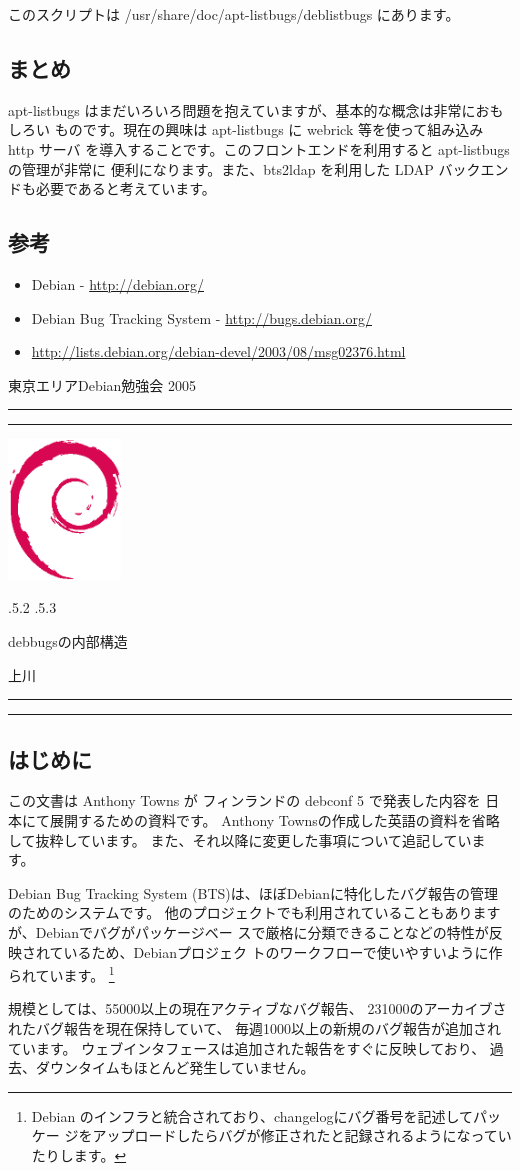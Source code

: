 \documentclass[mingoth,a4paper]{jsarticle}
\makeatletter
\renewcommand{\section}{\@startsection{section}{1}{\z@}%
    {\Cvs \@plus.5\Cdp \@minus.2\Cdp}%
    {.5\Cvs \@plus.3\Cdp}%
    {\normalfont\Large\headfont\raggedright\centering}} %
\newcommand{\dancersection}[2]{%
\newpage
東京エリアDebian勉強会 2005
\hrule
\vspace{0.5mm}
\hrule
\hfill{}\includegraphics[width=3cm]{image200502/openlogo-nd.eps}\\
\vspace{-4cm}
\begin{center}
  \section{#1}
\end{center}
\hfill{}#2\hspace{3cm}\space\\
\hrule
\hrule
\vspace{1cm}
}
\makeatother
\begin{document}
このスクリプトは /usr/share/doc/apt-listbugs/deblistbugs にあります。

\subsection{まとめ}

apt-listbugs はまだいろいろ問題を抱えていますが、基本的な概念は非常におもしろい
ものです。現在の興味は apt-listbugs に webrick 等を使って組み込み http サーバ
を導入することです。このフロントエンドを利用すると apt-listbugs の管理が非常に
便利になります。また、bts2ldap を利用した LDAP バックエンドも必要であると考えています。

\subsection{参考}

\begin{itemize}
\item Debian - \url{http://debian.org/}
\item Debian Bug Tracking System - \url{http://bugs.debian.org/}
\item \url{http://lists.debian.org/debian-devel/2003/08/msg02376.html}
\end{itemize}


\dancersection{debbugsの内部構造}{上川}
\label{sec:uekawa}

\subsection{はじめに}

この文書は Anthony Towns が フィンランドの debconf 5 で発表した内容を
日本にて展開するための資料です。
Anthony Townsの作成した英語の資料を省略して抜粋しています。
また、それ以降に変更した事項について追記しています。

Debian Bug Tracking System (BTS)は、ほぼDebianに特化したバグ報告の管理
のためのシステムです。
他のプロジェクトでも利用されていることもありますが、Debianでバグがパッケージベー
スで厳格に分類できることなどの特性が反映されているため、Debianプロジェク
トのワークフローで使いやすいように作られています。
\footnote{Debian のインフラと統合されており、changelogにバグ番号を記述してパッケー
ジをアップロードしたらバグが修正されたと記録されるようになっていたりします。}

規模としては、55000以上の現在アクティブなバグ報告、
231000のアーカイブされたバグ報告を現在保持していて、
毎週1000以上の新規のバグ報告が追加されています。
ウェブインタフェースは追加された報告をすぐに反映しており、
過去、ダウンタイムもほとんど発生していません。
\end{document}
